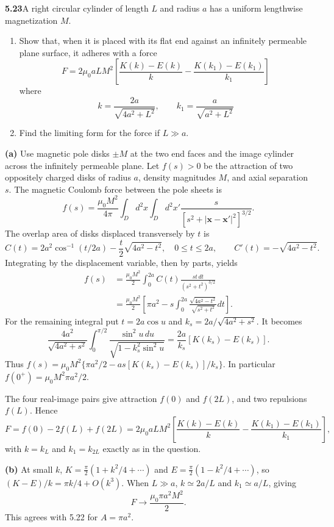 \par\bigskip
\noindent\textbf{5.23}\quad A right circular cylinder of length $L$ and radius $a$ has a uniform lengthwise magnetization $M$.
\begin{enumerate}
\item[(a)] Show that, when it is placed with its flat end against an infinitely permeable plane surface, it adheres with a force
\[
F=2\mu_{0}aLM^{2}\left[\frac{K(k)-E(k)}{k}-\frac{K(k_{1})-E(k_{1})}{k_{1}}\right]
\]
where
\[
k=\frac{2a}{\sqrt{4a^{2}+L^{2}}},\qquad k_{1}=\frac{a}{\sqrt{a^{2}+L^{2}}}
\]
\item[(b)] Find the limiting form for the force if $L\gg a$.
\end{enumerate}
\solution
\textbf{(a)} Use magnetic pole disks $\pm M$ at the two end faces and
the image cylinder across the infinitely permeable plane.
Let $f(s)>0$ be the attraction of two oppositely charged disks of
radius $a$, density magnitudes $M$, and axial separation $s$.
The magnetic Coulomb force between the pole sheets is
\[
f(s)=\frac{\mu_0M^2}{4\pi}\int_Dd^2x\int_Dd^2x'
\frac{s}{[s^2+|\mathbf x-\mathbf x'|^2]^{3/2}}.
\]
The overlap area of disks displaced transversely by $t$ is
\[
C(t)=2a^2\cos^{-1}(t/2a)-\frac t2\sqrt{4a^2-t^2},\quad
0\le t\le2a,\qquad C'(t)=-\sqrt{4a^2-t^2}.
\]
Integrating by the displacement variable, then by parts, yields
\[
\begin{split}
f(s)&=\frac{\mu_0M^2}{2}\int_0^{2a}
C(t)\frac{st\,dt}{(s^2+t^2)^{3/2}}\\
&=\frac{\mu_0M^2}{2}\left[
\pi a^2-s\int_0^{2a}\frac{\sqrt{4a^2-t^2}}{\sqrt{s^2+t^2}}dt\right].
\end{split}
\]
For the remaining integral put $t=2a\cos u$ and
$k_s=2a/\sqrt{4a^2+s^2}$. It becomes
\[
\frac{4a^2}{\sqrt{4a^2+s^2}}\int_0^{\pi/2}
\frac{\sin^2u\,du}{\sqrt{1-k_s^2\sin^2u}}
=\frac{2a}{k_s}[K(k_s)-E(k_s)].
\]
Thus
$f(s)=\mu_0M^2\{\pi a^2/2-as[K(k_s)-E(k_s)]/k_s\}$.
In particular $f(0^+)=\mu_0M^2\pi a^2/2$.

The four real-image pairs give attraction $f(0)$ and $f(2L)$,
and two repulsions $f(L)$. Hence
\[
F=f(0)-2f(L)+f(2L)
=\boxed{2\mu_0aLM^2\left[
\frac{K(k)-E(k)}k-\frac{K(k_1)-E(k_1)}{k_1}\right]},
\]
with $k=k_L$ and $k_1=k_{2L}$ exactly as in the question.

\textbf{(b)} At small $k$,
$K=\frac\pi2(1+k^2/4+\cdots)$ and
$E=\frac\pi2(1-k^2/4+\cdots)$, so $(K-E)/k=\pi k/4+O(k^3)$.
When $L\gg a$, $k\simeq2a/L$ and $k_1\simeq a/L$, giving
\[
\boxed{F\longrightarrow \frac{\mu_0\pi a^2M^2}{2}.}
\]
This agrees with 5.22 for $A=\pi a^2$.


